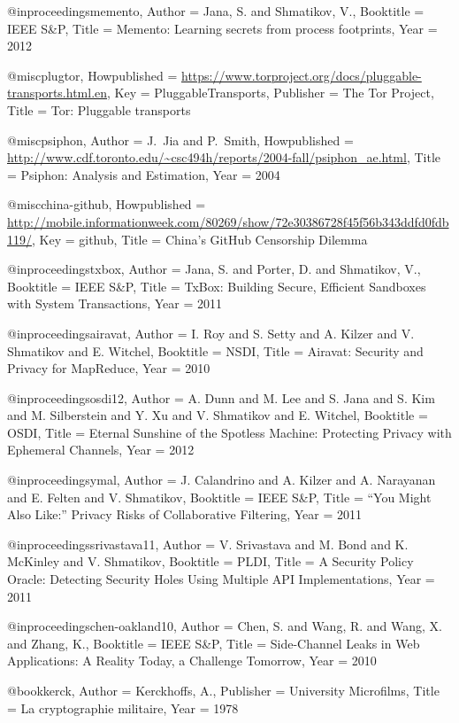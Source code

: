 {{{{{	@inproceedings{memento,
	Author = {Jana, S. and Shmatikov, V.},
	Booktitle = {IEEE S\&P},
	Title = {{Memento: Learning secrets from process footprints}},
	Year = {2012}}
	
	@misc{plugtor,
	Howpublished = {\url{https://www.torproject.org/docs/pluggable-transports.html.en}},
	Key = {PluggableTransports},
	Publisher = {The Tor Project},
	Title = {{Tor: Pluggable transports}}}
	
	@misc{psiphon,
	Author = {J.~Jia and P.~Smith},
	Howpublished = {\url{http://www.cdf.toronto.edu/~csc494h/reports/2004-fall/psiphon_ae.html}},
	Title = {{Psiphon: Analysis and Estimation}},
	Year = 2004}
	
	@misc{china-github,
	Howpublished = {\url{http://mobile.informationweek.com/80269/show/72e30386728f45f56b343ddfd0fdb119/}},
	Key = {github},
	Title = {{China's GitHub Censorship Dilemma}}}
	
	@inproceedings{txbox,
	Author = {Jana, S. and Porter, D. and Shmatikov, V.},
	Booktitle = {IEEE S\&P},
	Title = {{TxBox: Building Secure, Efficient Sandboxes with System Transactions}},
	Year = {2011}}
	
	@inproceedings{airavat,
	Author = {I. Roy and S. Setty and A. Kilzer and V. Shmatikov and E. Witchel},
	Booktitle = {NSDI},
	Title = {{Airavat: Security and Privacy for MapReduce}},
	Year = {2010}}
	
	@inproceedings{osdi12,
	Author = {A. Dunn and M. Lee and S. Jana and S. Kim and M. Silberstein and Y. Xu and V. Shmatikov and E. Witchel},
	Booktitle = {OSDI},
	Title = {{Eternal Sunshine of the Spotless Machine: Protecting Privacy with Ephemeral Channels}},
	Year = {2012}}
	
	@inproceedings{ymal,
	Author = {J. Calandrino and A. Kilzer and A. Narayanan and E. Felten and V. Shmatikov},
	Booktitle = {IEEE S\&P},
	Title = {{``You Might Also Like:'' Privacy Risks of Collaborative Filtering}},
	Year = {2011}}
	
	@inproceedings{srivastava11,
	Author = {V. Srivastava and M. Bond and K. McKinley and V. Shmatikov},
	Booktitle = {PLDI},
	Title = {{A Security Policy Oracle: Detecting Security Holes Using Multiple API Implementations}},
	Year = {2011}}
	
	@inproceedings{chen-oakland10,
	Author = {Chen, S. and Wang, R. and Wang, X. and Zhang, K.},
	Booktitle = {IEEE S\&P},
	Title = {{Side-Channel Leaks in Web Applications: A Reality Today, a Challenge Tomorrow}},
	Year = {2010}}
	
	@book{kerck,
	Author = {Kerckhoffs, A.},
	Publisher = {University Microfilms},
	Title = {{La cryptographie militaire}},
	Year = {1978}}
	
}}}}}
